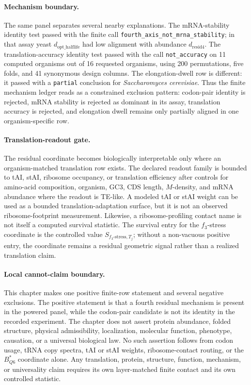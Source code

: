 \paragraph{Mechanism boundary.}
The same panel separates several nearby explanations. The mRNA-stability identity test passed with the finite call \texttt{fourth\_axis\_not\_mrna\_stability}; in that assay yeast $d_{\mathrm{opt\_halflife}}$ had low alignment with abundance $d_{\mathrm{resid4}}$. The translation-accuracy identity test passed with the call \texttt{not\_accuracy} on 11 computed organisms out of 16 requested organisms, using 200 permutations, five folds, and 41 synonymous design columns. The elongation-dwell row is different: it passed with a \texttt{partial} conclusion for \textit{Saccharomyces cerevisiae}. Thus the finite mechanism ledger reads as a constrained exclusion pattern: codon-pair identity is rejected, mRNA stability is rejected as dominant in its assay, translation accuracy is rejected, and elongation dwell remains only partially aligned in one organism-specific row.

\paragraph{Translation-readout gate.}
The residual coordinate becomes biologically interpretable only where an organism-matched translation row exists. The declared readout family is bounded to tAI, stAI, ribosome occupancy, or translation efficiency after controls for amino-acid composition, organism, GC3, CDS length, $M$-density, and mRNA abundance where the readout is TE-like. A modeled tAI or stAI weight can be used as a bounded translation-adaptation surface, but it is not an observed ribosome-footprint measurement. Likewise, a ribosome-profiling contact name is not itself a computed survival statistic. The survival entry for the $f_{3}$-stress coordinate is the controlled value $S_{f_{3}\text{-}\mathrm{stress},T_{j}}$; without a non-vacuous positive entry, the coordinate remains a residual geometric signal rather than a realized translation claim.

\paragraph{Local cannot-claim boundary.}
This chapter makes one positive finite-row statement and several negative exclusions. The positive statement is that a fourth residual mechanism is present in the powered panel, while the codon-pair candidate is not its identity in the recorded experiment. The chapter does not assert protein abundance, folded structure, physical admissibility, localization, molecular function, phenotype, causation, or a universal biological law. No such assertion follows from codon usage, tRNA copy spectra, tAI or stAI weights, ribosome-contact routing, or the $B^{*}_{Q6}$ coordinate alone. Any translation, protein, structure, function, mechanism, or universality claim requires its own layer-matched finite contact and its own controlled statistic.